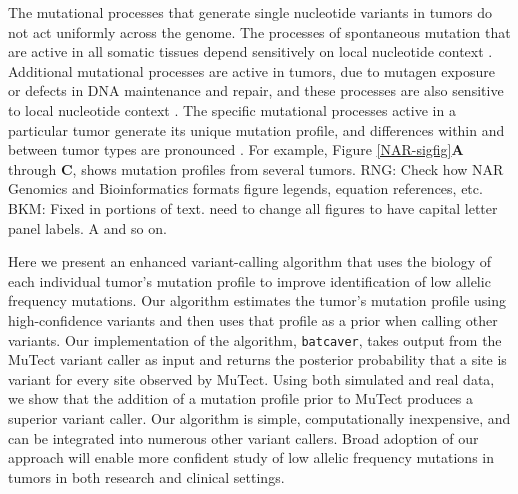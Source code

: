\documentclass[a4,center,fleqn]{NAR}
\newcommand{\rngcomment}[1]{{\color{red}RNG: #1}}
\newcommand{\bkmcomment}[1]{{\color{blue}BKM: #1}}
\begin{document}
The mutational processes that generate single nucleotide variants in tumors do not act uniformly across the genome.
The processes of spontaneous mutation that are active in all somatic tissues depend sensitively on local nucleotide context \citep{Nik-Zainal2012a,Alexandrov2015,Lee-Six2018}. 
Additional mutational processes are active in tumors, due to mutagen exposure or defects in DNA maintenance and repair, and these processes are also sensitive to local nucleotide context \citep{Alexandrov2013a,Helleday2014a,Nik-Zainal2016,Kandoth2013,Alexandrov2016}.
The specific mutational processes active in a particular tumor generate its unique mutation profile, and differences within and between tumor types are pronounced \cite{Stephens2005, Burrell2013a, Nakamura2015, Witkiewicz2015, Kumar2016}.
For example, Figure \ref{NAR-sigfig}\textbf{A} through \textbf{C}, shows mutation profiles from several tumors.
\rngcomment{Check how NAR Genomics and Bioinformatics formats figure legends, equation references, etc.}
\bkmcomment{Fixed in portions of text. need to change all figures to have capital letter panel labels. A and so on.}

Here we present an enhanced variant-calling algorithm that uses the biology of each individual tumor's mutation profile to improve identification of low allelic frequency mutations.
Our algorithm estimates the tumor's mutation profile using high-confidence variants and then uses that profile as a prior when calling other variants.
Our implementation of the algorithm, \texttt{batcaver}, takes output from the MuTect variant caller as input and returns the posterior probability that a site is variant for every site observed by MuTect.
Using both simulated and real data, we show that the addition of a mutation profile prior to MuTect produces a superior variant caller.
Our algorithm is simple, computationally inexpensive, and can be integrated into numerous other variant callers.
Broad adoption of our approach will enable more confident study of low allelic frequency mutations in tumors in both research and clinical settings.
\end{document}
